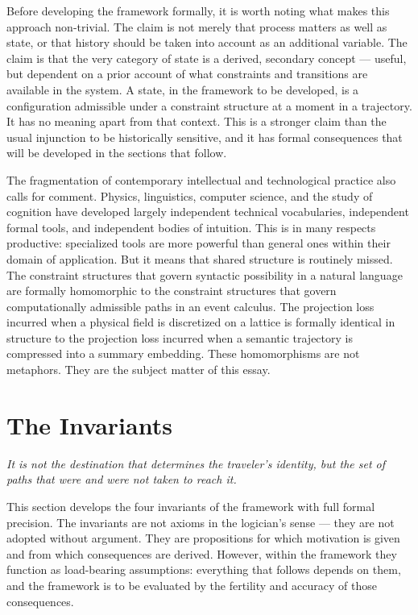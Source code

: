 \documentclass[12pt, twoside]{article}
\theoremstyle{plain}
\theoremstyle{definition}
\theoremstyle{remark}
\begin{document}
Before developing the framework formally, it is worth noting what makes
this approach non-trivial.
The claim is not merely that process matters as well as state, or that
history should be taken into account as an additional variable.
The claim is that the very category of state is a derived, secondary
concept — useful, but dependent on a prior account of what constraints
and transitions are available in the system.
A state, in the framework to be developed, is a configuration admissible
under a constraint structure at a moment in a trajectory.
It has no meaning apart from that context.
This is a stronger claim than the usual injunction to be historically
sensitive, and it has formal consequences that will be developed in
the sections that follow.

The fragmentation of contemporary intellectual and technological practice
also calls for comment.
Physics, linguistics, computer science, and the study of cognition have
developed largely independent technical vocabularies, independent formal
tools, and independent bodies of intuition.
This is in many respects productive: specialized tools are more powerful
than general ones within their domain of application.
But it means that shared structure is routinely missed.
The constraint structures that govern syntactic possibility in a
natural language are formally homomorphic to the constraint structures
that govern computationally admissible paths in an event calculus.
The projection loss incurred when a physical field is discretized on a
lattice is formally identical in structure to the projection loss incurred
when a semantic trajectory is compressed into a summary embedding.
These homomorphisms are not metaphors.
They are the subject matter of this essay.

\newpage

\section{The Invariants}

\epigraph{\itshape
  It is not the destination that determines the traveler's identity,
  but the set of paths that were and were not taken to reach it.}{}

This section develops the four invariants of the framework with
full formal precision.
The invariants are not axioms in the logician's sense — they are not
adopted without argument.
They are propositions for which motivation is given and from which
consequences are derived.
However, within the framework they function as load-bearing assumptions:
everything that follows depends on them, and the framework is to be
evaluated by the fertility and accuracy of those consequences.
\end{document}
